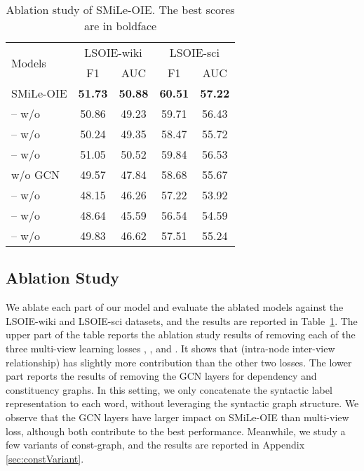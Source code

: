 \documentclass[11pt]{article}
\newcommand{\mname}{SMiLe-OIE\xspace}
\begin{document}
\begin{table}
\centering
    \begin{tabular}{l|cc|cc}
    \toprule
    \multirow{2}{*}{Models} &
    \multicolumn{2}{c|}{LSOIE-wiki} &
    \multicolumn{2}{c}{LSOIE-sci}\\
      & F1 & AUC & F1 & AUC\\
    \midrule
    \mname & \textbf{51.73} & \textbf{50.88} & \textbf{60.51} & \textbf{57.22}\\
    -- w/o   & 50.86 & 49.23         & 59.71 & 56.43  \\
    -- w/o  & 50.24 & 49.35         & 58.47 & 55.72      \\
    -- w/o  & 51.05 & 50.52          & 59.84  & 56.53 \\
    \midrule
    w/o GCN  & 49.57 & 47.84         & 58.68 & 55.67     \\
    -- w/o  & 48.15 & 46.26         & 57.22  &  53.92       \\
    -- w/o  & 48.64 & 45.59         & 56.54  &  54.59     \\
    -- w/o  & 49.83 & 46.62         & 57.51  & 55.24        \\
    \bottomrule
    \end{tabular}
\caption{Ablation study of \mname. The best scores are in boldface}
\label{tab:ablation}
\end{table}


\subsection{Ablation Study}
We ablate each part of our model and evaluate the ablated models against the LSOIE-wiki and LSOIE-sci datasets, and the results are reported in Table~\ref{tab:ablation}. 
The upper part of the table reports the ablation study results of removing each of the three multi-view learning losses , , and . It shows that  (intra-node inter-view relationship) has slightly more contribution than the other two losses. The lower part reports the results of removing
the GCN layers for dependency and constituency graphs. In this setting, we only concatenate the syntactic label representation to each word, without leveraging the syntactic graph structure. 
We observe that the GCN layers have larger impact on \mname than multi-view loss, although both contribute to the best performance. 
Meanwhile, we study a few variants of const-graph, and the results are reported in Appendix \ref{sec:constVariant}.
\end{document}

